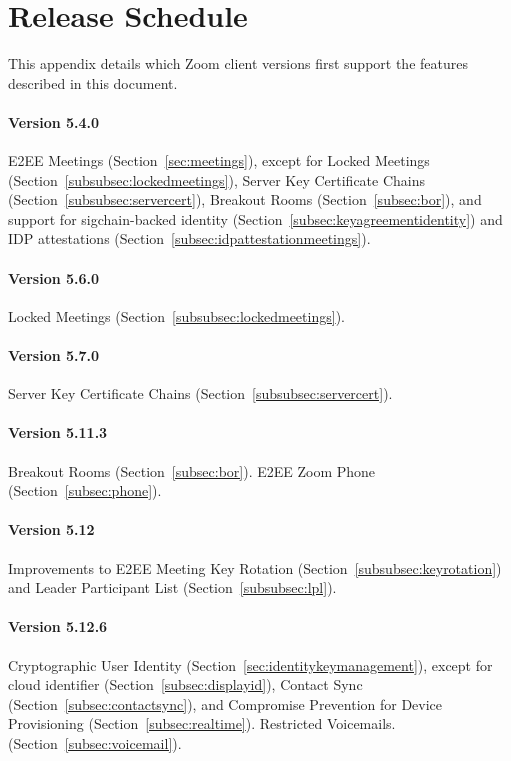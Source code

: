 \section{Release Schedule}
\label{appendix:releases}
This appendix details which Zoom client versions first support the features described in this
document.

\paragraph{Version 5.4.0}
E2EE Meetings (Section~\ref{sec:meetings}), except for Locked Meetings
(Section~\ref{subsubsec:lockedmeetings}), Server Key Certificate Chains
(Section~\ref{subsubsec:servercert}), Breakout Rooms (Section~\ref{subsec:bor}), and support for
sigchain-backed identity (Section~\ref{subsec:keyagreementidentity}) and IDP attestations
(Section~\ref{subsec:idpattestationmeetings}).

\paragraph{Version 5.6.0}
Locked Meetings (Section~\ref{subsubsec:lockedmeetings}).

\paragraph{Version 5.7.0}
Server Key Certificate Chains (Section~\ref{subsubsec:servercert}).

\paragraph{Version 5.11.3}
Breakout Rooms (Section~\ref{subsec:bor}). E2EE Zoom Phone (Section~\ref{subsec:phone}).

\paragraph{Version 5.12}
Improvements to E2EE Meeting Key Rotation (Section~\ref{subsubsec:keyrotation}) and Leader
Participant List (Section~\ref{subsubsec:lpl}).

\paragraph{Version 5.12.6}
Cryptographic User Identity (Section~\ref{sec:identitykeymanagement}), except for cloud identifier
(Section~\ref{subsec:displayid}), Contact Sync (Section~\ref{subsec:contactsync}), and Compromise
Prevention for Device Provisioning (Section~\ref{subsec:realtime}). Restricted Voicemails.
(Section~\ref{subsec:voicemail}).

